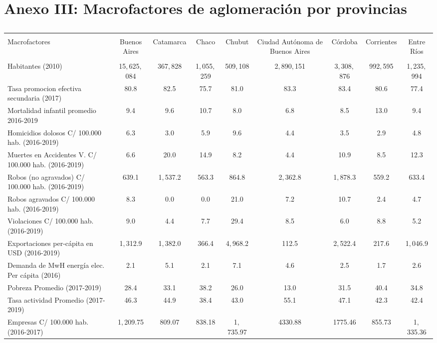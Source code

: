 \documentclass[12pt,a4paper]{article}
\begin{document}
\section{Anexo III: Macrofactores de aglomeración por provincias}
\begin{table} \centering \tiny
 \centering 
  \caption{} 
  \label{} 
\begin{tabular}{@{\extracolsep{5pt}} lcccccccc} 
\\[-1.8ex]\hline 
\hline \\[-1.8ex] 
Macrofactores & Buenos Aires & Catamarca & Chaco & Chubut & Ciudad Autónoma de Buenos Aires & Córdoba & Corrientes & Entre Ríos \\ 
\hline \\[-1.8ex] 
Habitantes (2010) & 15$,$625$,$084 &   367$,$828 &  1$,$055$,$259 &   509$,$108 &  2$,$890$,$151 &  3$,$308$,$876 &   992$,$595 &  1$,$235$,$994 \\ 
Tasa promocion efectiva secundaria (2017) & 80.8 & 82.5 & 75.7 & 81.0 & 83.3 & 83.4 & 80.6 & 77.4 \\ 
Mortalidad infantil promedio 2016-2019 &  9.4 &  9.6 & 10.7 &  8.0 &  6.8 &  8.5 & 13.0 &  9.4 \\ 
Homicidios dolosos C/ 100.000 hab. (2016-2019) & 6.3 & 3.0 & 5.9 & 9.6 & 4.4 & 3.5 & 2.9 & 4.8 \\ 
Muertes en Accidentes V. C/ 100.000  hab.  (2016-2019) &  6.6 & 20.0 & 14.9 &  8.2 &  4.4 & 10.9 &  8.5 & 12.3 \\ 
Robos (no agravados) C/ 100.000 hab. (2016-2019) &  639.1 & 1$,$537.2 &  563.3 &  864.8 & 2$,$362.8 & 1$,$878.3 &  559.2 &  633.4 \\ 
Robos agravados C/ 100.000 hab. (2016-2019) &   8.3 &   0.0 &   0.0 &  21.0 &   7.2 &  10.7 &   2.4 &   4.7 \\ 
Violaciones  C/ 100.000 hab. (2016-2019) &  9.0 &  4.4 &  7.7 & 29.4 &  8.5 &  6.0 &  8.8 &  5.2 \\ 
Exportaciones per-cápita en USD (2016-2019) & 1$,$312.9 & 1$,$382.0 &  366.4 & 4$,$968.2 &  112.5 & 2$,$522.4 &  217.6 & 1$,$046.9 \\ 
Demanda de MwH energía elec. Per cápita (2016) & 2.1 & 5.1 & 2.1 & 7.1 & 4.6 & 2.5 & 1.7 & 2.6 \\ 
Pobreza Promedio (2017-2019) & 28.4 & 33.1 & 38.2 & 26.0 & 13.0 & 31.5 & 40.4 & 34.8 \\ 
Tasa actividad Promedio (2017-2019) & 46.3 & 44.9 & 38.4 & 43.0 & 55.1 & 47.1 & 42.3 & 42.4 \\ 
Empresas  C/ 100.000 hab. (2016-2017) & 1$,$209.75 &  809.07 &  838.18 & 1$,$735.97 & 4330.88 & 1775.46 &  855.73 & 1$,$335.36 \\ 

\end{tabular}
\end{table}
\end{document}
